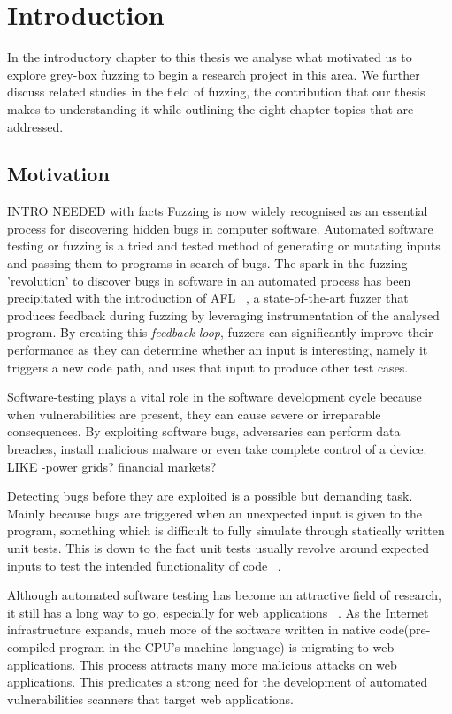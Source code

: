 \chapter{Introduction}
\minitoc
\vspace*{1cm}

In the introductory chapter to this thesis we analyse what motivated us to explore grey-box fuzzing to begin a research project in this area. We further discuss related studies in the field of fuzzing, the contribution that our thesis makes to understanding it while outlining the eight chapter topics that are addressed.

\section{Motivation}
INTRO NEEDED with facts
Fuzzing is now widely recognised as an essential process for discovering hidden bugs in computer software. Automated software testing or fuzzing is a tried and tested method of generating or mutating inputs and passing them to programs in search of bugs. The spark in the fuzzing 'revolution' to discover bugs in software in an automated process has been precipitated with the introduction of AFL ~\cite{zalewski2015american}, a state-of-the-art fuzzer that produces feedback during fuzzing by leveraging instrumentation of the analysed program. By creating this \textit{feedback loop}, fuzzers can significantly improve their performance as they can determine whether an input is interesting, namely it triggers a new code path, and uses that input to produce other test cases.

Software-testing plays a vital role in the software development cycle because when vulnerabilities are present, they can cause severe or irreparable consequences. By exploiting software bugs, adversaries can perform data breaches, install malicious malware or even take complete control of a device. LIKE -power grids? financial markets?

Detecting bugs before they are exploited is a possible but demanding task. Mainly because bugs are triggered when an unexpected input is given to the program, something which is difficult to fully simulate through statically written unit tests. This is down to the fact unit tests usually revolve around expected inputs to test the intended functionality of code ~\cite{aschermann2019nautilus}.

Although automated software testing has become an attractive field of research, it still has a long way to go, especially for web applications ~\cite{doupe2010johnny}. As the Internet infrastructure expands, much more of the software written in native code(pre-compiled program in the CPU's machine language) is migrating to web applications. This process attracts many more malicious attacks on web applications. This predicates a strong need for the development of automated vulnerabilities scanners that target web applications.
 
